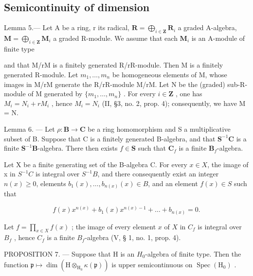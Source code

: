 \subsection{Semicontinuity of dimension}

Lemma 5.--- Let A be a ring, r its radical, \(\mathbf{R} = \bigoplus_{i \in \mathbf{Z}} \mathbf{R}_i\) a graded A-algebra, \(\mathbf{M} = \bigoplus_{i \in \mathbf{Z}} \mathbf{M}_i\) a graded R-module. We assume that each \(\mathbf{M}_i\) is an A-module of finite type

and that M/rM is a finitely generated R/rR-module. Then M is a finitely generated R-module. Let \(m_{1}, \ldots, m_{n}\) be homogeneous elements of M, whose images in M/rM generate the R/rR-module M/rM. Let N be the (graded) sub-R-module of M generated by \(\{m_{1}, \ldots, m_{n}\}\) . For every \(i \in \mathbf{Z}\) , one has \(M_{i} = N_{i} + rM_{i}\) , hence \(M_{i} = N_{i}\) (II, §3, no. 2, prop. 4); consequently, we have M = N.

Lemma 6. --- Let \(\rho: \mathbf{B} \to \mathbf{C}\) be a ring homomorphism and S a multiplicative subset of B. Suppose that C is a finitely generated B-algebra, and that \(\mathbf{S}^{-1}\mathbf{C}\) is a finite \(\mathbf{S}^{-1}\mathbf{B}\)-algebra. There then exists \(f \in \mathbf{S}\) such that \(\mathbf{C}_f\) is a finite \(\mathbf{B}_f\)-algebra.

Let X be a finite generating set of the B-algebra C. For every \(x \in X\), the image of x in \(S^{-1}C\) is integral over \(S^{-1}B\), and there consequently exist an integer \(n(x) \geqslant 0\), elements \(b_{1}(x), \ldots, b_{n(x)}(x) \in B\), and an element \(f(x) \in S\) such that

\[
f (x) x ^ {n (x)} + b _ {1} (x) x ^ {n (x) - 1} + \dots + b _ {n (x)} = 0.
\]

Let \(f = \prod_{x \in X} f(x)\) ; the image of every element \(x\) of \(X\) in \(C_f\) is integral over \(B_f\) , hence \(C_f\) is a finite \(B_f\)-algebra (V, § 1, no. 1, prop. 4).

PROPOSITION 7. — Suppose that H is an \(H_{0}\)-algebra of finite type. Then the function \(\mathfrak{p} \mapsto \dim(\mathrm{H} \otimes_{\mathrm{H}_{0}} \kappa(\mathfrak{p}))\) is upper semicontinuous on \(\operatorname{Spec}(\mathrm{H}_{0})\) .

